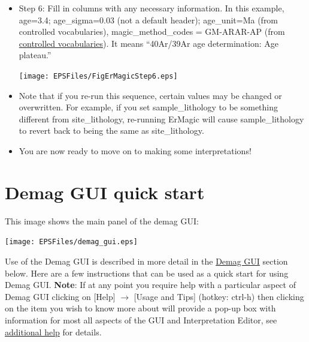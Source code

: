 \documentclass[11pt]{book}
\begin{document}
{\begin{itemize}
\texttt{[image: EPSFiles/FigErMagicStep5.eps]}

\item Step 6: Fill in columns with any necessary information.   In this example, age=3.4; age\_sigma=0.03 (not a default header); age\_unit=Ma (from controlled vocabularies), magic\_method\_codes  = GM-ARAR-AP (from \href{http://earthref.org/MAGIC/shortlists.htm}{controlled vocabularies}). It means ``40Ar/39Ar age determination: Age plateau.''

\texttt{[image: EPSFiles/FigErMagicStep6.eps]}

\item Note that if you re-run this sequence, certain values may be changed or overwritten.  For example, if you set sample\_lithology to be something different from site\_lithology, re-running ErMagic will cause sample\_lithology to revert back to being the same as site\_lithology.
\item You are now ready to move on to making some interpretations!


\end{itemize}


\section{Demag GUI quick start}
\label{sect:demag_gui}

This image shows the main panel of the demag GUI:

\texttt{[image: EPSFiles/demag\_gui.eps]}

Use of the Demag GUI is described in more detail in the \href{#demag_gui.py}{Demag GUI} section below. Here are a few instructions that can be used as a quick start for using Demag GUI. {\bf Note}: If at any point you require help with a particular aspect of Demag GUI clicking on [Help] $\rightarrow$ [Usage and Tips] (hotkey: ctrl-h) then clicking on the item you wish to know more about will provide a pop-up box with information for most all aspects of the GUI and Interpretation Editor, see \hyperref[add-help]{additional help} for details.

}
\end{document}

